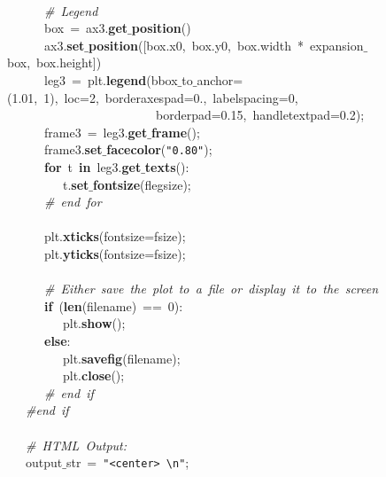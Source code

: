 \mbox{}\ \ \ \ \ \  \\
\mbox{}\ \ \ \ \ \ \textit{\#\ Legend} \\
\mbox{}\ \ \ \ \ \ box\ =\ ax3.\textbf{get$\_$position}() \\
\mbox{}\ \ \ \ \ \ ax3.\textbf{set$\_$position}([box.x0,\ box.y0,\ box.width\ *\ expansion$\_$box,\ box.height]) \\
\mbox{}\ \ \ \ \ \ leg3\ =\ plt.\textbf{legend}(bbox$\_$to$\_$anchor=(1.01,\ 1),\ loc=2,\ borderaxespad=0.,\ labelspacing=0,\  \\
\mbox{}\ \ \ \ \ \ \ \ \ \ \ \ \ \ \ \ \ \ \ \ \ \ \ \ borderpad=0.15,\ handletextpad=0.2); \\
\mbox{}\ \ \ \ \ \ frame3\ =\ leg3.\textbf{get$\_$frame}(); \\
\mbox{}\ \ \ \ \ \ frame3.\textbf{set$\_$facecolor}(\texttt{"{}0.80"{}}); \\
\mbox{}\ \ \ \ \ \ \textbf{for}\ t\ \textbf{in}\ leg3.\textbf{get$\_$texts}(): \\
\mbox{}\ \ \ \ \ \ \ \ \ t.\textbf{set$\_$fontsize}(flegsize); \\
\mbox{}\ \ \ \ \ \ \textit{\#\ end\ for} \\
\mbox{}\ \ \ \ \ \  \\
\mbox{}\ \ \ \ \ \ plt.\textbf{xticks}(fontsize=fsize); \\
\mbox{}\ \ \ \ \ \ plt.\textbf{yticks}(fontsize=fsize); \\
\mbox{}\ \ \ \ \ \  \\
\mbox{}\ \ \ \ \ \ \textit{\#\ Either\ save\ the\ plot\ to\ a\ file\ or\ display\ it\ to\ the\ screen} \\
\mbox{}\ \ \ \ \ \ \textbf{if}\ (\textbf{len}(filename)\ ==\ 0): \\
\mbox{}\ \ \ \ \ \ \ \ \ plt.\textbf{show}(); \\
\mbox{}\ \ \ \ \ \ \textbf{else}: \\
\mbox{}\ \ \ \ \ \ \ \ \ plt.\textbf{savefig}(filename); \\
\mbox{}\ \ \ \ \ \ \ \ \ plt.\textbf{close}(); \\
\mbox{}\ \ \ \ \ \ \textit{\#\ end\ if} \\
\mbox{}\ \ \ \textit{\#end\ if} \\
\mbox{}\ \ \  \\
\mbox{}\ \ \ \textit{\#\ HTML\ Output:} \\
\mbox{}\ \ \ output$\_$str\ =\ \texttt{"{}\textless{}center\textgreater{}\ \textbackslash{}n"{}}; \\
